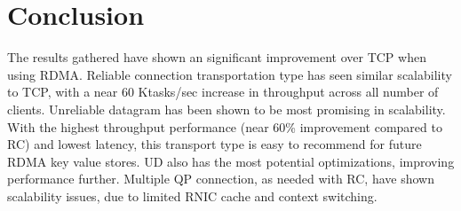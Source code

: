
\chapter{Conclusion}\label{ch:conclusion} %



\ifpdf
    \graphicspath{{7/figures/PNG/}{7/figures/PDF/}{7/figures/}}
\else
    \graphicspath{{7/figures/EPS/}{7/figures/}}
\fi


% 
The results gathered have shown an significant improvement over TCP when using RDMA.
Reliable connection transportation type has seen similar scalability to TCP, with a near 60 Ktasks/sec increase in throughput across all number of clients.
Unreliable datagram has been shown to be most promising in scalability.
With the highest throughput performance (near 60\% improvement compared to RC) and lowest latency, this transport type is easy to recommend for future RDMA key value stores.
UD also has the most potential optimizations, improving performance further.
Multiple QP connection, as needed with RC, have shown scalability issues, due to limited RNIC cache and context switching.

